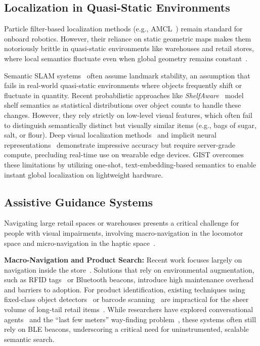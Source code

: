 \documentclass[sigconf,anonymous,review]{acmart}
\begin{document}
\subsection{Localization in Quasi-Static Environments}
Particle filter-based localization methods (e.g., AMCL~\cite{foxKLDSamplingAdaptiveParticle2001, nav2_amcl}) remain standard for onboard robotics. However, their reliance on static geometric maps makes them notoriously brittle in quasi-static environments like warehouses and retail stores, where local semantics fluctuate even when global geometry remains constant~\cite{yinSurveyGlobalLiDAR2024}.

Semantic SLAM systems~\cite{goswamiEfficientRealTimeLocalization2023a, zimmermanLongTermLocalizationUsing2023} often assume landmark stability, an assumption that fails in real-world quasi-static environments where objects frequently shift or fluctuate in quantity. Recent probabilistic approaches like \emph{ShelfAware}~\cite{11478317} model shelf semantics as statistical distributions over object counts to handle these changes. However, they rely strictly on low-level visual features, which often fail to distinguish semantically distinct but visually similar items (e.g., bags of sugar, salt, or flour). Deep visual localization methods~\cite{dong2025reloc3r, loiseau2025alligat0r} and implicit neural representations~\cite{kuangIRMCLImplicitRepresentationBased2023} demonstrate impressive accuracy but require server-grade compute, precluding real-time use on wearable edge devices. GIST overcomes these limitations by utilizing one-shot, text-embedding-based semantics to enable instant global localization on lightweight hardware.

\subsection{Assistive Guidance Systems}
Navigating large retail spaces or warehouses presents a critical challenge for people with visual impairments, involving macro-navigation in the locomotor space and micro-navigation in the haptic space~\cite{gharpure2008robot}.

\textbf{Macro-Navigation and Product Search:} Recent work focuses largely on navigation inside the store~\cite{kulyukin2010accessible,kulyukin2005robocart,kulyukin2006ergonomics}. Solutions that rely on environmental augmentation, such as RFID tags~\cite{lopez-de-ipinaBlindShoppingEnablingAccessible2011} or Bluetooth beacons, introduce high maintenance overhead and barriers to adoption. For product identification, existing techniques using fixed-class object detectors~\cite{feng2020research} or barcode scanning~\cite{lookout, nicholson2009shoptalk} are impractical for the sheer volume of long-tail retail items~\cite{NielsenIQ}. While researchers have explored conversational agents~\cite{kamikubo2024we, kaniwa2024chitchatguide} and the ``last few meters'' way-finding problem~\cite{saha2019closing}, these systems often still rely on BLE beacons, underscoring a critical need for uninstrumented, scalable semantic search.
\end{document}
